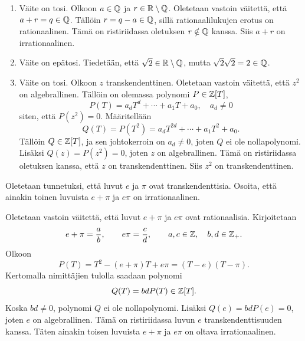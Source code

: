 \documentclass[11pt,a4paper]{amsart}
\begin{document}
\begin{solution}
\leavevmode\par
\begin{enumerate}[label=(\alph*), topsep=0.35em]
  \item Väite on tosi. Olkoon \(a \in \mathbb{Q}\) ja
    \(r \in \mathbb{R} \setminus \mathbb{Q}\). Oletetaan vastoin väitettä, että
    \(a+r=q\in\mathbb{Q}\). Tällöin \(r=q-a\in\mathbb{Q}\), sillä
    rationaalilukujen erotus on rationaalinen. Tämä on ristiriidassa
    oletuksen \(r\notin\mathbb{Q}\) kanssa. Siis \(a+r\) on irrationaalinen.
  \item Väite on epätosi. Tiedetään, että \(\sqrt{2} \in \mathbb{R} \setminus \mathbb{Q}\),
    mutta \(\sqrt{2}\sqrt{2} = 2 \in \mathbb{Q}\).
  \item Väite on tosi. Olkoon \(z\) transkendenttinen. Oletetaan vastoin
    väitettä, että \(z^2\) on algebrallinen. Tällöin on olemassa
    polynomi \(P \in \mathbb{Z}[T]\),
    \[
      P(T) = a_dT^d + \cdots + a_1T + a_0, \quad a_d \neq 0
    \]
    siten, että \(P(z^2) = 0\). Määritellään
    \[
      Q(T) = P(T^2) = a_dT^{2d} + \cdots + a_1T^2 + a_0.
    \]
    Tällöin \(Q \in \mathbb{Z}[T]\), ja sen johtokerroin on \(a_d\neq0\),
    joten \(Q\) ei ole nollapolynomi. Lisäksi \(Q(z)=P(z^2)=0\),
    joten \(z\) on algebrallinen. Tämä on ristiriidassa oletuksen
    kanssa, että \(z\) on transkendenttinen. Siis \(z^2\) on
    transkendenttinen.

\end{enumerate}
\end{solution}

\begin{exercise}
Oletetaan tunnetuksi, että luvut \(e\) ja \(\pi\) ovat
transkendenttisia. Osoita, että ainakin toinen luvuista \(e + \pi\)
ja \(e\pi\) on irrationaalinen.
\end{exercise}

\begin{solution}
Oletetaan vastoin väitettä, että luvut \(e+\pi\) ja \(e\pi\) ovat
rationaalisia. Kirjoitetaan
\[
  e+\pi=\frac{a}{b},\qquad e\pi=\frac{c}{d},
  \qquad a,c\in\mathbb{Z},\quad b,d\in\mathbb{Z}_+.
\]
Olkoon
\[
  P(T) = T^2 - (e + \pi)T + e\pi = (T - e)(T - \pi).
\]
Kertomalla nimittäjien tulolla saadaan polynomi
\[
  Q(T)=bdP(T)\in\mathbb{Z}[T].
\]
Koska \(bd\neq0\), polynomi \(Q\) ei ole nollapolynomi. Lisäksi
\(Q(e)=bdP(e)=0\), joten \(e\) on algebrallinen. Tämä on ristiriidassa
luvun \(e\) transkendenttisuuden kanssa.
Täten ainakin toisen luvuista \(e + \pi\) ja \(e\pi\) on oltava
irrationaalinen.
\end{solution}
\end{document}
